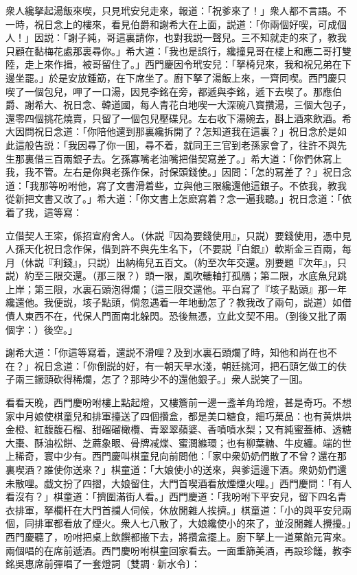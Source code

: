 衆人纔拏起湯飯來喫，只見玳安兒走來，報道：「祝爹來了！」衆人都不言語。不一時，祝日念上的樓來，看見伯爵和謝希大在上面，説道：「你兩個好喫，可成個人！」因説：「謝子純，哥這裏請你，也對我説一聲兒。三不知就走的來了，教我只顧在黏梅花處那裏尋你。」希大道：「我也是誤行，纔撞見哥在樓上和應二哥打雙陸，走上來作揖，被哥留住了。」西門慶因令玳安兒：「拏椅兒來，我和祝兄弟在下邊坐罷。」於是安放鍾筯，在下席坐了。廚下拏了湯飯上來，一齊同喫。西門慶只喫了一個包兒，呷了一口湯，因見李銘在旁，都遞與李銘，遞下去喫了。那應伯爵、謝希大、祝日念、韓道國，每人青花白地喫一大深碗八寳攢湯，三個大包子，還零四個挑花燒賣，只留了一個包兒壓碟兒。左右收下湯碗去，斟上酒來飲酒。希大因問祝日念道：「你陪他還到那裏纔拆開了？怎知道我在這裏？」祝日念於是如此這般告説：「我因尋了你一囬，尋不着，就同王三官到老孫家會了，往許不與先生那裏借三百兩銀子去。乞孫寡嘴老油嘴把借契寫差了。」希大道：「你們休寫上我，我不管。左右是你與老孫作保，討保頭錢使。」因問：「怎的冩差了？」祝日念道：「我那等吩咐他，寫了文書滑着些，立與他三限纔還他這銀子。不依我，教我從新把文書又改了。」希大道：「你文書上怎麽寫着？念一遍我聽。」祝日念道：「依着了我，這等寫：

\begin{myquote}[\markfont]
立借契人王寀，係招宣府舍人。{\kaishu（休説『因為要錢使用』，只説）}要錢使用，憑中見人孫天化祝日念作保，借到許不與先生名下，{\kaishu（不要説『白銀』）}軟斯金三百兩，每月{\kaishu（休説『利錢』，只説）}出納梅兒五百文。{\kaishu（約至次年交還。別要題『次年』，只説）}約至三限交還。{\kaishu（那三限？）}頭一限，風吹轆軸打孤鴈；第二限，水底魚兒跳上岸；第三限，水裏石頭泡得爛；{\kaishu（這三限交還他。平白寫了『垓子點頭』那一年纔還他。我便説，垓子點頭，倘忽遇着一年地動怎了？教我改了兩句，説道）}如借債人東西不在，代保人門面南北躲閃。恐後無憑，立此文契不用。{\kaishu（到後又批了兩個字：）}後空。」
\end{myquote}

謝希大道：「你這等寫着，還説不滑哩？及到水裏石頭爛了時，知他和尚在也不在？」祝日念道：「你倒説的好，有一朝天旱水淺，朝廷挑河，把石頭乞做工的伕子兩三鐝頭砍得稀爛，怎了？那時少不的還他銀子。」衆人説笑了一囬。

看看天晚，西門慶吩咐樓上點起燈，又樓簷前一邊一盞羊角玲燈，甚是奇巧。不想家中月娘使棋童兒和排軍擡送了四個攢盒，都是美口糖食，細巧菓品：也有黄烘烘金橙、紅馥馥石榴、甜磂磂橄欖、青翠翠蘋婆、香噴噴水梨；又有純蜜蓋柿、透糖大棗、酥油松餅、芝蔴象眼、骨牌减煠、蜜潤縧環；也有柳葉糖、牛皮纏。端的世上稀奇，寰中少有。西門慶叫棋童兒向前問他：「家中衆奶奶們散了不曾？還在那裏喫酒？誰使你送來？」棋童道：「大娘使小的送來，與爹這邊下酒。衆奶奶們還未散哩。戯文扮了四摺，大娘留住，大門首喫酒看放煙煙火哩。」西門慶問：「有人看沒有？」棋童道：「擠圍滿街人看。」西門慶道：「我吩咐下平安兒，留下四名青衣排軍，拏欄杆在大門首攔人伺候，休放閒雜人挨擠。」棋童道：「小的與平安兒兩個，同排軍都看放了煙火。衆人七八散了，大娘纔使小的來了，並沒閒雜人攪擾。」西門慶聽了，吩咐把桌上飲饌都搬下去，將攢盒擺上。廚下拏上一道菓餡元宵來。兩個唱的在席前遞酒。西門慶吩咐棋童回家看去。一面重篩美酒，再設珍饈，教李銘吳惠席前彈唱了一套燈詞〔雙調·新水令〕：

